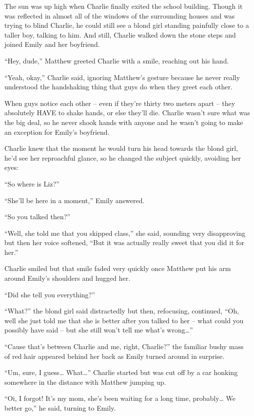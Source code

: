 The sun was up high when Charlie finally exited the school building. Though it was reflected in almost all of the windows of the surrounding houses and was trying to blind Charlie, he could still see a blond girl standing painfully close to a taller boy, talking to him.
And still, Charlie walked down the stone steps and joined Emily and her boyfriend.

“Hey, dude,” Matthew greeted Charlie with a smile, reaching out his hand.

“Yeah, okay,” Charlie said, ignoring Matthew's gesture because he never really understood the handshaking thing that guys do when they greet each other.

When guys notice each other – even if they're thirty two meters apart – they absolutely HAVE to shake hands, or else they'll die. Charlie wasn't sure what was the big deal, so he never shook hands with anyone and he wasn't going to make an exception for Emily's boyfriend.

Charlie knew that the moment he would turn his head towards the blond girl, he'd see her reproachful glance, so he changed the subject quickly, avoiding her eyes:

“So where is Liz?”

“She'll be here in a moment,” Emily answered.

“So you talked then?”

“Well, she told me that you skipped class,” she said, sounding very disapproving but then her voice softened, “But it was actually really sweet that you did it for her.”

Charlie smiled but that smile faded very quickly once Matthew put his arm around Emily's shoulders and hugged her.

“Did she tell you everything?”

“What?” the blond girl said distractedly but then, refocusing, continued, “Oh, well she just told me that she is better after you talked to her – what could you possibly have said – but she still won't tell me what's wrong…”

“Cause that's between Charlie and me, right, Charlie?” the familiar bushy mass of red hair appeared behind her back as Emily turned around in surprise.

“Um, sure, I guess… What…” Charlie started but was cut off by a car honking somewhere in the distance with Matthew jumping up.

“Oi, I forgot! It's my mom, she's been waiting for a long time, probably… We better go,” he said, turning to Emily.


